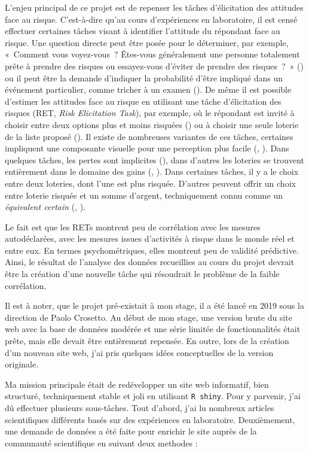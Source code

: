 \documentclass[12pt]{article}
\begin{document}
L'enjeu principal de ce projet est de repenser les tâches d'élicitation
des attitudes face au risque. C'est-à-dire qu'au cours d'expériences en
laboratoire, il est censé effectuer certaines tâches visant à identifier
l'attitude du répondant face au risque. Une question directe peut être
posée pour le déterminer, par exemple, «~Comment vous voyez-vous~?
Êtes-vous généralement une personne totalement prête à prendre des
risques ou essayez-vous d'éviter de prendre des risques~?~»
(\citet{SOEP2007}) ou il peut être la demande d'indiquer la probabilité
d'être impliqué dans un événement particulier, comme tricher à un examen
(\citet{Blais2006}). De même il est possible d'estimer les attitudes
face au risque en utilisant une tâche d'élicitation des risques (RET,
\emph{Risk Elicitation Task}), par exemple, où le répondant est invité à
choisir entre deux options plus et moins risquées (\citet{Holt2002}) ou
à choisir une seule loterie de la liste proposé (\citet{Eckel2002}). Il
existe de nombreuses variantes de ces tâches, certaines impliquent une
composante visuelle pour une perception plus facile (\citet{Hunt2005},
\citet{Crosetto2013}). Dans quelques tâches, les pertes sont implicites
(\citet{Menkhoff_Sakha_2017}), dans d'autres les loteries se trouvent
entièrement dans le domaine des gains (\citet{Eckel2002},
\citet{Holt2002}). Dans certaines tâches, il y a le choix entre deux
loteries, dont l'une est plus risquée. D'autres peuvent offrir un choix
entre loterie risquée et un somme d'argent, techniquement connu comme un
\emph{équivalent certain} (\citet{Menkhoff_Sakha_2017},
\citet{Csermely2014}).

Le fait est que les RETs montrent peu de corrélation avec les mesures
autodéclarées, avec les mesures issues d'activités à risque dans le
monde réel et entre eux. En termes psychométriques, elles montrent peu
de validité prédictive. Ainsi, le résultat de l'analyse des données
recueillies au cours du projet devrait être la création d'une nouvelle
tâche qui résoudrait le problème de la faible corrélation.

Il est à noter, que le projet pré-existait à mon stage, il a été lancé
en 2019 sous la direction de Paolo Crosetto. Au début de mon stage, une
version brute du site web avec la base de données modérée et une série
limitée de fonctionnalités était prête, mais elle devait être
entièrement repensée. En outre, lors de la création d'un nouveau site
web, j'ai pris quelques idées conceptuelles de la version originale.

Ma mission principale était de redévelopper un site web informatif, bien
structuré, techniquement stable et joli en utilisant \texttt{R\ shiny}.
Pour y parvenir, j'ai dû effectuer plusieurs sous-tâches. Tout d'abord,
j'ai lu nombreux articles scientifiques différents basés sur des
expériences en laboratoire. Deuxièmement, une demande de données a été
faite pour enrichir le site auprès de la communauté scientifique en
suivant deux methodes :
\end{document}
